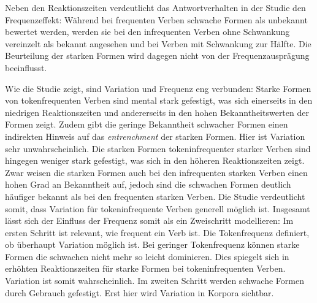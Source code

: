 Neben den Reaktionszeiten verdeutlicht das Antwortverhalten in der Studie den Frequenzeffekt: Während bei frequenten Verben schwache Formen als unbekannt bewertet werden, werden sie bei den infrequenten Verben ohne Schwankung vereinzelt als bekannt angesehen und bei Verben mit Schwankung zur Hälfte. Die Beurteilung der starken Formen wird dagegen nicht von der Frequenzausprägung beeinflusst.

Wie die Studie zeigt, sind Variation und Frequenz eng verbunden: Starke Formen von tokenfrequenten Verben sind mental stark gefestigt, was sich einerseits in den niedrigen Re\-ak\-tions\-zei\-ten und andererseits in den hohen Bekanntheitswerten der Formen zeigt. Zudem gibt die geringe Bekanntheit schwacher Formen einen indirekten Hinweis auf das \textit{entrenchment} der starken Formen. Hier ist Variation sehr unwahrscheinlich. Die starken Formen tokeninfrequenter starker Verben sind hingegen weniger stark gefestigt, was sich in den höheren Reaktionszeiten zeigt. Zwar weisen die starken Formen auch bei den infrequenten starken Verben einen hohen Grad an Bekanntheit auf, jedoch sind die schwachen Formen deutlich häufiger bekannt als bei den frequenten starken Verben. Die Studie verdeutlicht somit, dass Variation für tokeninfrequente Verben generell möglich ist. Insgesamt lässt sich der Einfluss der Frequenz somit als ein Zweischritt modellieren: Im ersten Schritt ist relevant, wie frequent ein Verb ist. Die Tokenfrequenz definiert, ob überhaupt Variation möglich ist. Bei geringer Tokenfrequenz können starke Formen die schwachen nicht mehr so leicht dominieren. Dies spiegelt sich in erhöhten Reaktionszeiten für starke Formen bei tokeninfrequenten Verben. Variation ist somit wahrscheinlich. Im zweiten Schritt werden schwache Formen durch Gebrauch gefestigt. Erst hier wird Variation in Korpora sichtbar.



